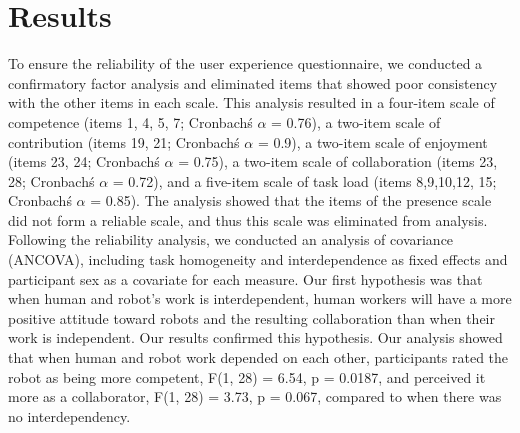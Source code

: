 \section{Results}
       To ensure the reliability of the user experience questionnaire, we conducted a confirmatory factor analysis and eliminated items that showed poor consistency with the other items in each scale. This analysis resulted in a four-item scale of competence (items 1, 4, 5, 7; Cronbach\' s $\alpha$ = 0.76), a two-item scale of contribution (items 19, 21; Cronbach\' s $\alpha$ = 0.9), a two-item scale of enjoyment (items 23, 24; Cronbach\' s $\alpha$ = 0.75),  a two-item scale of collaboration (items 23, 28; Cronbach\' s $\alpha$ = 0.72), and a five-item scale of task load (items 8,9,10,12, 15; Cronbach\' s $\alpha$ = 0.85). The analysis showed that the items of the presence scale did not form a reliable scale, and thus this scale was eliminated from analysis.\\
       Following the reliability analysis, we conducted an analysis of covariance (ANCOVA), including task homogeneity and interdependence as fixed effects and participant sex as a covariate for each measure. Our first hypothesis was that when human and robot’s work is interdependent, human workers will have a more positive attitude toward robots and the resulting collaboration than when their work is independent. Our results confirmed this hypothesis. Our  analysis showed that when human and robot work depended on each other, participants rated the robot as being more competent, F(1, 28) = 6.54, p = 0.0187, and perceived it more as a collaborator, F(1, 28) = 3.73, p = 0.067, compared to when there was no interdependency. 

